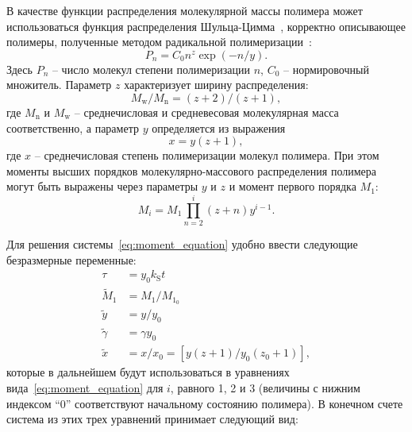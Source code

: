 В качестве функции распределения молекулярной массы полимера может использоваться функция распределения Шульца-Цимма~\cite{Boyd_3, Schulz-Zimm_distribution}, корректно описывающее полимеры, полученные методом радикальной полимеризации~\cite{Schulz-Zimm_distribution_proof}:
\begin{equation} \label{eq:Schulz-Zimm_distribution}
	P_n = C_0 n^z \exp (-n/y).
\end{equation}
Здесь $P_n$ -- число молекул степени полимеризации $n$, $C_0$ -- нормировочный множитель. Параметр $z$ характеризует ширину распределения:
\begin{equation} \label{eq:Schulz-Zimm_1}
	M_\mathrm{w} / M_\mathrm{n} = (z+2) /(z+1),
\end{equation}
где $M_\mathrm{n}$ и $M_\mathrm{w}$ -- среднечисловая и средневесовая молекулярная масса соответственно, а параметр $y$ определяется из выражения
\begin{equation} \label{eq:Schulz-Zimm_2}
	x = y(z+1),
\end{equation}
где $x$ -- среднечисловая степень полимеризации молекул полимера. При этом моменты высших порядков молекулярно-массового распределения полимера могут быть выражены через параметры $y$ и $z$ и момент первого порядка $M_1$:
\begin{equation}
	M_i=M_1 \prod_{n=2}^i(z+n) y^{i-1}.
\end{equation}

Для решения системы~\ref{eq:moment_equation} удобно ввести следующие безразмерные переменные:
\begin{equation} \label{eq:dim_less_MW}
	\begin{aligned}
		\tau & = y_0 k_\mathrm{S} t \\
		\tilde{M}_1 & = M_1 / M_{1_0} \\
		\tilde{y} & = y / y_0 \\
		\tilde{\gamma} & = \gamma y_0 \\
		\tilde{x} & = x / x_0 = \left[y(z+1) / y_0\left(z_0+1\right)\right],
	\end{aligned}
\end{equation}
которые в дальнейшем будут использоваться в уравнениях вида~\ref{eq:moment_equation} для $i$, равного 1, 2 и 3 (величины с нижним индексом ``0'' соответствуют начальному состоянию полимера).
В конечном счете система из этих трех уравнений принимает следующий вид:

